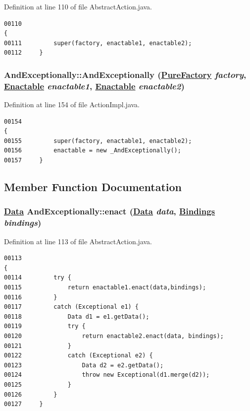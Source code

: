 Definition at line 110 of file Abstract\-Action.java.\footnotesize\begin{verbatim}00110                                                                                              {
00111         super(factory, enactable1, enactable2);
00112     }
\end{verbatim}\normalsize 
\hypertarget{classAndExceptionally_a2}{
\subsubsection[AndExceptionally]{\setlength{\rightskip}{0pt plus 5cm}And\-Exceptionally::And\-Exceptionally (\hyperlink{classPureFactory}{Pure\-Factory} {\em factory}, \hyperlink{interfaceEnactable}{Enactable} {\em enactable1}, \hyperlink{interfaceEnactable}{Enactable} {\em enactable2})}}
\label{classAndExceptionally_a2}




Definition at line 154 of file Action\-Impl.java.\footnotesize\begin{verbatim}00154                                                                                              {
00155         super(factory, enactable1, enactable2);
00156         enactable = new _AndExceptionally();
00157     }
\end{verbatim}\normalsize 


\subsection{Member Function Documentation}
\hypertarget{classAndExceptionally_a1}{
\subsubsection[enact]{\setlength{\rightskip}{0pt plus 5cm}\hyperlink{interfaceData}{Data} And\-Exceptionally::enact (\hyperlink{interfaceData}{Data} {\em data}, \hyperlink{interfaceBindings}{Bindings} {\em bindings})}}
\label{classAndExceptionally_a1}




Definition at line 113 of file Abstract\-Action.java.\footnotesize\begin{verbatim}00113                                                                                {
00114         try {
00115             return enactable1.enact(data,bindings);
00116         }
00117         catch (Exceptional e1) {
00118             Data d1 = e1.getData();
00119             try {
00120                 return enactable2.enact(data, bindings);
00121             }
00122             catch (Exceptional e2) {
00123                 Data d2 = e2.getData();
00124                 throw new Exceptional(d1.merge(d2));
00125             }
00126         }
00127     }
\end{verbatim}\normalsize 


